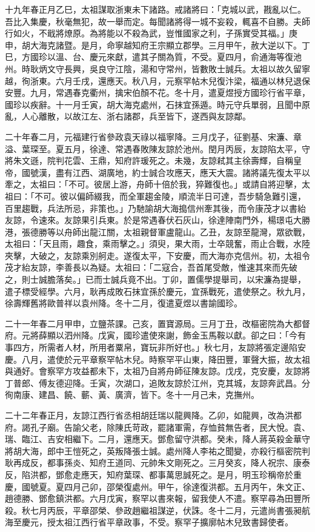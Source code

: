 \begin{pinyinscope}
十九年春正月乙巳，太祖謀取浙東未下諸路。戒諸將曰：「克城以武，戡亂以仁。吾比入集慶，秋毫無犯，故一舉而定。每聞諸將得一城不妄殺，輒喜不自勝。夫師行如火，不戢將燎原。為將能以不殺為武，豈惟國家之利，子孫實受其福。」庚申，胡大海克諸暨。是月，命寧越知府王宗顯立郡學。三月甲午，赦大逆以下。丁巳，方國珍以溫、台、慶元來獻，遣其子關為質，不受。夏四月，俞通海等復池州。時耿炳文守長興，吳良守江陰，湯和守常州，皆數敗士誠兵。太祖以故久留寧越，徇浙東。六月壬戌，還應天。秋八月，元察罕帖木兒復汴梁，福通以林兒退保安豐。九月，常遇春克衢州，擒宋伯顏不花。冬十月，遣夏煜授方國珍行省平章，國珍以疾辭。十一月壬寅，胡大海克處州，石抹宜孫遁。時元守兵單弱，且聞中原亂，人心離散，以故江左、浙右諸郡，兵至皆下，遂西與友諒鄰。

二十年春二月，元福建行省參政袁天祿以福寧降。三月戊子，征劉基、宋濂、章溢、葉琛至。夏五月，徐達、常遇春敗陳友諒於池州。閏月丙辰，友諒陷太平，守將朱文遜，院判花雲、王鼎，知府許瑗死之。未幾，友諒弒其主徐壽輝，自稱皇帝，國號漢，盡有江西、湖廣地，約士誠合攻應天，應天大震。諸將議先復太平以牽之，太祖曰：「不可。彼居上游，舟師十倍於我，猝難復也。」或請自將迎擊，太祖曰：「不可。彼以偏師綴我，而全軍趨金陵，順流半日可達，吾步騎急難引還，百里趨戰，兵法所忌，非策也。」乃馳諭胡大海搗信州牽其後，而令康茂才以書紿友諒，令速來。友諒果引兵東。於是常遇春伏石灰山，徐達陣南門外，楊璟屯大勝港，張德勝等以舟師出龍江關，太祖親督軍盧龍山。乙丑，友諒至龍灣，眾欲戰，太祖曰：「天且雨，趣食，乘雨擊之。」須臾，果大雨，士卒競奮，雨止合戰，水陸夾擊，大破之，友諒乘別舸走。遂復太平，下安慶，而大海亦克信州。初，太祖令茂才紿友諒，李善長以為疑。太祖曰：「二寇合，吾首尾受敵，惟速其來而先破之，則士誠膽落矣。」已而士誠兵竟不出。丁卯，置儒學提舉司，以宋濂為提舉，遣子標受經學。六月，耿再成敗石抹宜孫於慶元，宜孫戰死，遣使祭之。秋九月，徐壽輝舊將歐普祥以袁州降。冬十二月，復遣夏煜以書諭國珍。

二十一年春二月甲申，立鹽茶課。己亥，置寶源局。三月丁丑，改樞密院為大都督府。元將薛顯以泗州降。戊寅，國珍遣使來謝，飾金玉馬鞍以獻。卻之曰：「今有事四方，所需者人材，所用者粟帛，寶玩非所好也。」秋七月，友諒將張定邊陷安慶。八月，遣使於元平章察罕帖木兒。時察罕平山東，降田豐，軍聲大振，故太祖與通好。會察罕方攻益都未下，太祖乃自將舟師征陳友諒。戊戌，克安慶，友諒將丁普郎、傅友德迎降。壬寅，次湖口，追敗友諒於江州，克其城，友諒奔武昌。分徇南康、建昌、饒、蘄、黃、廣濟，皆下。冬十一月己未，克撫州。

二十二年春正月，友諒江西行省丞相胡廷瑞以龍興降。乙卯，如龍興，改為洪都府。謁孔子廟。告諭父老，除陳氏苛政，罷諸軍需，存恤貧無告者，民大悅。袁、瑞、臨江、吉安相繼下。二月，還應天。鄧愈留守洪都。癸未，降人蔣英殺金華守將胡大海，郎中王愷死之，英叛降張士誠。處州降人李祐之聞變，亦殺行樞密院判耿再成反，都事孫炎、知府王道同、元帥朱文剛死之。三月癸亥，降人祝宗、康泰反，陷洪都，鄧愈走應天，知府葉琛、都事萬思誠死之。是月，明玉珍稱帝於重慶，國號夏。夏四月己卯，邵榮復處州。甲午，徐達復洪都。五月丙午，朱文正、趙德勝、鄧愈鎮洪都。六月戊寅，察罕以書來報，留我使人不遣。察罕尋為田豐所殺。秋七月丙辰，平章邵榮、參政趙繼祖謀逆，伏誅。冬十二月，元遣尚書張昶航海至慶元，授太祖江西行省平章政事，不受。察罕子擴廓帖木兒致書歸使者。


\end{pinyinscope}
